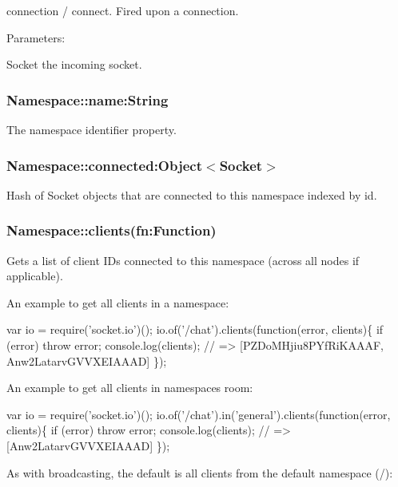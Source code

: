 \begin{DoxyItemize}
\item {\ttfamily connection} / {\ttfamily connect}. Fired upon a connection.

Parameters\+:
\begin{DoxyItemize}
\item {\ttfamily Socket} the incoming socket.
\end{DoxyItemize}
\end{DoxyItemize}

\subsubsection*{Namespace\+::name\+:String}

The namespace identifier property.

\subsubsection*{Namespace\+::connected\+:Object$<$\+Socket$>$}

Hash of {\ttfamily Socket} objects that are connected to this namespace indexed by {\ttfamily id}.

\subsubsection*{Namespace\+::clients(fn\+:\+Function)}

Gets a list of client I\+Ds connected to this namespace (across all nodes if applicable).

An example to get all clients in a namespace\+:


\begin{DoxyCode}
var io = require('socket.io')();
io.of('/chat').clients(function(error, clients)\{
  if (error) throw error;
  console.log(clients); // => [PZDoMHjiu8PYfRiKAAAF, Anw2LatarvGVVXEIAAAD]
\});
\end{DoxyCode}


An example to get all clients in namespace\textquotesingle{}s room\+:


\begin{DoxyCode}
var io = require('socket.io')();
io.of('/chat').in('general').clients(function(error, clients)\{
  if (error) throw error;
  console.log(clients); // => [Anw2LatarvGVVXEIAAAD]
\});
\end{DoxyCode}


As with broadcasting, the default is all clients from the default namespace (\textquotesingle{}/\textquotesingle{})\+:


